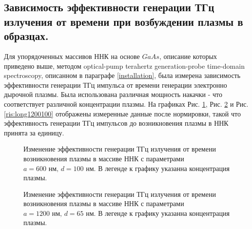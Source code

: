 \documentclass[a4paper,14pt,russian]{extreport}
\begin{document}
			\subsection{Зависимость эффективности генерации ТГц излучения от времени при возбуждении плазмы в образцах.}
				Для упорядоченных массивов ННК на основе $GaAs$, описание которых приведено выше, методом optical-pump terahertz generation-probe time-domain\\ spectroscopy, описанном в параграфе \ref{installation}, была измерена зависимость эффективности генерации ТГц импульса от времени генерации электронно дырочной плазмы. Была использована различная мощность накачки - что соответствует различной концентрации плазмы. На графиках Рис. \ref{ris:long600100}, Рис. \ref{ris:long120065} и Рис. \ref{ris:long1200100} отображены измеренные данные после нормировки, такой что эффективность генерации ТГц импульсов до возникновения плазмы в ННК принята за единицу.\par
				\begin{figure}[h]
					\caption{Изменение эффективности генерации ТГц излучения от времени возникновения плазмы в массиве ННК с параметрами $a = 600 \text{ нм, } d = 100 \text{ нм}$. В легенде к графику указанна концентрация плазмы.}
				\label{ris:long600100}
				\end{figure}
				\begin{figure}[h!]
					\caption{Изменение эффективности генерации ТГц излучения от времени возникновения плазмы в массиве ННК с параметрами $a = 1200 \text{ нм, } d = 65 \text{ нм}$. В легенде к графику указанна концентрация плазмы.}
				\label{ris:long120065}
				\end{figure}
\end{document}
